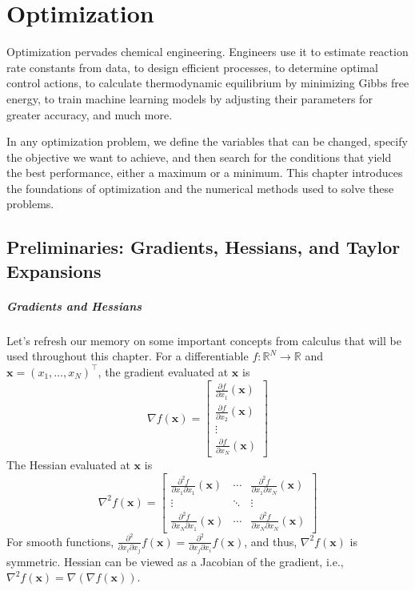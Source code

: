 \chapter{Optimization}

Optimization pervades chemical engineering. Engineers use it to estimate reaction rate constants from data, to design efficient processes, to determine optimal control actions, to calculate thermodynamic equilibrium by minimizing Gibbs free energy, to train machine learning models by adjusting their parameters for greater accuracy, and much more.

In any optimization problem, we define the variables that can be changed, specify the objective we want to achieve, and then search for the conditions that yield the best performance, either a maximum or a minimum. This chapter introduces the foundations of optimization and the numerical methods used to solve these problems.

\section{Preliminaries: Gradients, Hessians, and Taylor Expansions}
\paragraph*{Gradients and Hessians}
Let's refresh our memory on some important concepts from calculus that will be used throughout this chapter. For a differentiable $f: \mathbb{R}^N \to \mathbb{R}$ and $\mathbf{x} = (x_1,\dots,x_N)^\top$, the gradient evaluated at $\mathbf{x}$ is
\begin{equation}
    \renewcommand{\arraystretch}{1.5}
    \nabla f(\mathbf{x}) = \begin{bmatrix}
        \frac{\partial f}{\partial x_1}(\mathbf{x}) \\
        \frac{\partial f}{\partial x_2}(\mathbf{x}) \\
        \vdots \\
        \frac{\partial f}{\partial x_N}(\mathbf{x})
    \end{bmatrix}
    \end{equation}
The Hessian evaluated at $\mathbf{x}$ is
\begin{equation}
    \renewcommand{\arraystretch}{1.5}
    \nabla^2 f(\mathbf{x}) = \begin{bmatrix}
        \frac{\partial^2 f}{\partial x_1\partial x_1}(\mathbf{x}) & \cdots & \frac{\partial^2 f}{\partial x_1\partial x_N}(\mathbf{x}) \\
        \vdots & \ddots & \vdots \\
        \frac{\partial^2 f}{\partial x_N\partial x_1}(\mathbf{x}) & \cdots & \frac{\partial^2 f}{\partial x_N\partial x_N}(\mathbf{x})
    \end{bmatrix}
\end{equation}
For smooth functions, $\frac{\partial^2}{\partial x_i\partial x_j}f (\mathbf{x}) = \frac{\partial^2}{\partial x_j\partial x_i}f(\mathbf{x})$, and thus, $\nabla^2 f(\mathbf{x})$ is symmetric. Hessian can be viewed as a Jacobian of the gradient, i.e., $\nabla^2 f(\mathbf{x}) = \nabla(\nabla f(\mathbf{x}))$. 

